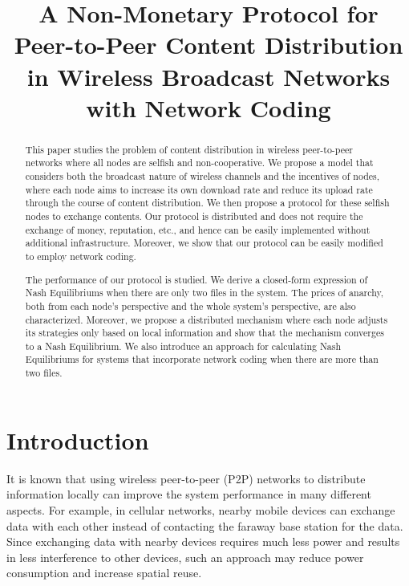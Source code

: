 \documentclass[11pt, conference]{IEEEtran}
\makeatletter
\def\blfootnote{\xdef\@thefnmark{}\@footnotetext}
\makeatother
\begin{document}
\title{A Non-Monetary Protocol for Peer-to-Peer Content Distribution in Wireless Broadcast Networks with Network Coding}
\author{
}
\maketitle\blfootnote{}

\begin{abstract}
 This paper studies the problem of content distribution in wireless peer-to-peer networks where all nodes are selfish and non-cooperative. We propose a model that considers both the broadcast nature of wireless channels and the incentives of nodes, where each node aims to increase its own download rate and reduce its upload rate through the course of content distribution. We then propose a protocol for these selfish nodes to exchange contents. Our protocol is distributed and does not require the exchange of money, reputation, etc., and hence can be easily implemented without additional infrastructure. Moreover, we show that our protocol can be easily modified to employ network coding.

 The performance of our protocol is studied. We derive a closed-form expression of Nash Equilibriums when there are only two files in the system. The prices of anarchy, both from each node's perspective and the whole system's perspective, are also characterized. Moreover, we propose a distributed mechanism where each node adjusts its strategies only based on local information and show that the mechanism converges to a Nash Equilibrium. We also introduce an approach for calculating Nash Equilibriums for systems that incorporate network coding when there are more than two files.
\end{abstract}

\section{Introduction}
\label{section:introduction}

It is known that using wireless peer-to-peer (P2P) networks to distribute information locally can improve the system performance in many different aspects. For example, in cellular networks, nearby mobile devices can exchange data with each other instead of contacting the faraway base station for the data. Since exchanging data with nearby devices requires much less power and results in less interference to other devices, such an approach may reduce power consumption and increase spatial reuse. 
\end{document}
